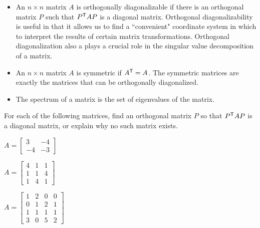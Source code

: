 \label{sec:orthog_diag_summ}
\begin{itemize}
\item An $n \times n$ matrix $A$ is orthogonally diagonalizable if there is an orthogonal matrix $P$ such that $P^{\mathsf{T}}AP$ is a diagonal matrix. Orthogonal diagonalizability is useful in that it allows us to find a ``convenient" coordinate system in which to interpret the results of certain matrix transformations. Orthogonal diagonalization also  a plays a crucial role in the singular value decomposition of a matrix.
\item An $n \times n$ matrix $A$ is symmetric if $A^{\mathsf{T}} = A$. The symmetric matrices are exactly the matrices that can be orthogonally diagonalized. 
\item The spectrum of a matrix is the set of eigenvalues of the matrix. 
\end{itemize}



\label{sec:orthog_diag_exer}
\be
\item For each of the following matrices, find an orthogonal matrix $P$ so that $P^{\mathsf{T}}AP$ is a diagonal matrix, or explain why no such matrix exists.
	\ba
\hspace{-0.3in}	\begin{minipage}{1.4in}
	\item $A = \left[ \begin{array}{rr} 3&-4 \\ -4&-3 \end{array} \right]$
	\end{minipage}
	\begin{minipage}{1.4in}
	\item $A = \left[ \begin{array}{ccc} 4&1&1 \\ 1&1&4 \\ 1&4&1 \end{array} \right]$
	\end{minipage}
	\begin{minipage}{1.4in}
	\item $A = \left[ \begin{array}{cccc} 1&2&0&0 \\ 0&1&2&1 \\ 1&1&1&1 \\ 3&0&5&2 \end{array} \right]$
	\end{minipage}
	\ea

